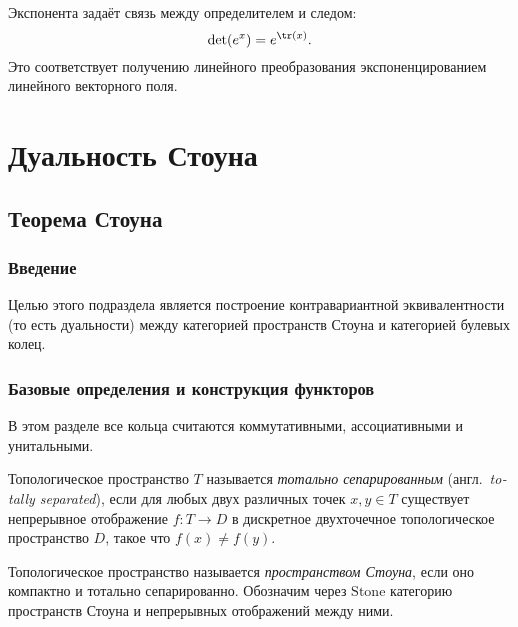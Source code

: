 \documentclass[
	extrafontsizes,
	11pt,
	hyphens,
]{memoir}
\begin{document}
\begin{observation}%
Экспонента задаёт связь между определителем и следом:
\[\det(e^x) = e^{\tr(x)}.\]
Это соответствует получению линейного преобразования экспоненцированием линейного векторного поля.
\end{observation}


\section{Дуальность Стоуна}

\subsection{Теорема Стоуна}

\subsubsection{Введение}

Целью этого подраздела является построение контравариантной эквивалентности (то есть дуальности) между категорией пространств Стоуна и категорией булевых колец.

\subsubsection{Базовые определения и конструкция функторов}

\begin{convention}
В этом разделе все кольца считаются коммутативными, ассоциативными и унитальными.
\end{convention}

\begin{definition}
Топологическое пространство $T$ называется \emph{тотально сепарированным} (англ.\ \textenglish{\emph{totally separated}}), если для любых двух различных точек $x,y \in T$ существует непрерывное отображение $f: T \to D$ в дискретное двухточечное топологическое пространство $D$, такое что $f(x) \neq f(y)$.
\end{definition}

\begin{definition}
Топологическое пространство называется \emph{пространством Стоуна}, если оно компактно и тотально сепарированно.
Обозначим через $\mathrm{Stone}$ категорию пространств Стоуна и непрерывных отображений между ними.
\end{definition}
\end{document}
